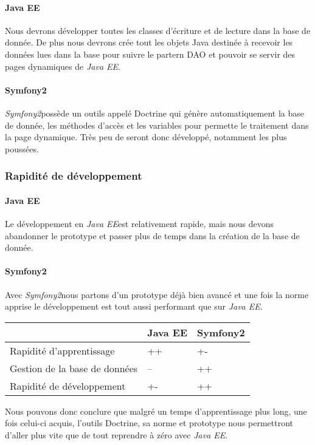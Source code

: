 \paragraph{Java EE}
Nous devrons développer toutes les classes d'écriture et de lecture dans la base de donnée. De plus nous devrons crée tout les objets Java destinée à recevoir les données lues dans la base pour suivre le partern DAO et pouvoir se servir des pages dynamiques de \textit{Java EE}.

\paragraph{Symfony2}
\textit{Symfony2}possède un outils appelé Doctrine qui génère automatiquement la base de donnée, les méthodes d'accès et les variables pour permette le traitement dans la page dynamique. Très peu de seront donc développé, notamment les plus poussées.

\subsubsection{Rapidité de développement}
\paragraph{Java EE}
Le développement en \textit{Java EE}est relativement rapide, mais nous devons abandonner le prototype et passer plus de temps dans la création de la base de donnée.

\paragraph{Symfony2}
Avec \textit{Symfony2}nous partons d'un prototype déjà bien avancé et une fois la norme apprise le développement est tout aussi performant que sur \textit{Java EE}.


\begin{tabular}{|m{125pt}|m{150pt}|m{150pt}|}
	\hline
	\null & \textbf{Java EE} & \textbf{Symfony2} \\
	\hline
	Rapidité d'apprentissage & ++ & +-\\
	\hline
	Gestion de la base de données & -- & ++\\
	\hline
	Rapidité de développement & +- & ++ \\
	\hline
\end{tabular} \vspace*{5mm}

Nous pouvons donc conclure que malgré un temps d'apprentissage plus long, une fois celui-ci acquis, l'outils Doctrine, sa norme et prototype nous permettront d'aller plus vite que de tout reprendre à zéro avec \textit{Java EE}.

